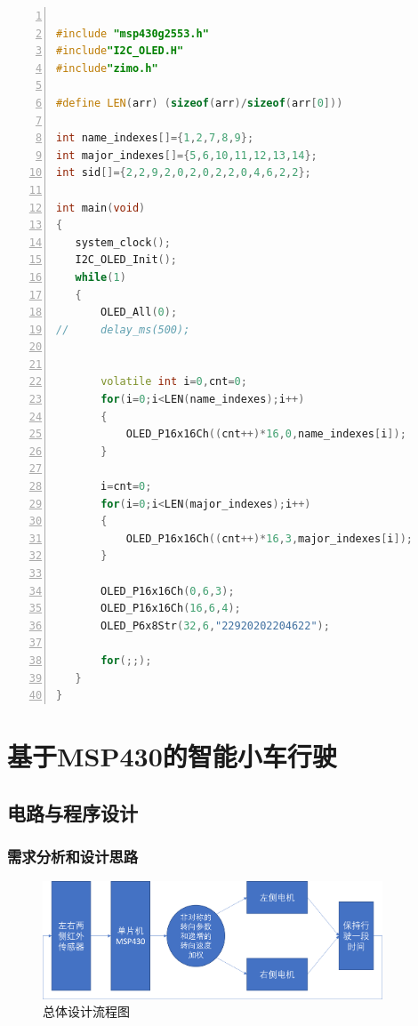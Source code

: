 \documentclass[a4paper,twoside,zihao=5,UTF8]{ctexart}
\begin{document}
\begin{spacing}{1.2}
\begin{lstlisting}[language=c++,numbers=left,style=CppStyle,caption=作业6,label={code:p6}]

#include "msp430g2553.h"
#include"I2C_OLED.H"
#include"zimo.h"

#define LEN(arr) (sizeof(arr)/sizeof(arr[0]))

int name_indexes[]={1,2,7,8,9};
int major_indexes[]={5,6,10,11,12,13,14};
int sid[]={2,2,9,2,0,2,0,2,2,0,4,6,2,2};

int main(void)
{
   system_clock();
   I2C_OLED_Init();
   while(1)
   {
	   OLED_All(0);
//	   delay_ms(500);


	   volatile int i=0,cnt=0;
	   for(i=0;i<LEN(name_indexes);i++)
	   {
	       OLED_P16x16Ch((cnt++)*16,0,name_indexes[i]);
	   }

	   i=cnt=0;
	   for(i=0;i<LEN(major_indexes);i++)
	   {
	       OLED_P16x16Ch((cnt++)*16,3,major_indexes[i]);
	   }

	   OLED_P16x16Ch(0,6,3);
	   OLED_P16x16Ch(16,6,4);
	   OLED_P6x8Str(32,6,"22920202204622");

	   for(;;);
   }
}
\end{lstlisting}


\section{基于MSP430的智能小车行驶}

\subsection{电路与程序设计}

\subsubsection{需求分析和设计思路}

\begin{figure}[htb]
	\centering
	\caption{总体设计流程图}
	\label{fig:flowchart}
	\includegraphics[width=0.9\textwidth]{flowchart.png}
\end{figure}


\end{spacing}
\end{document}
